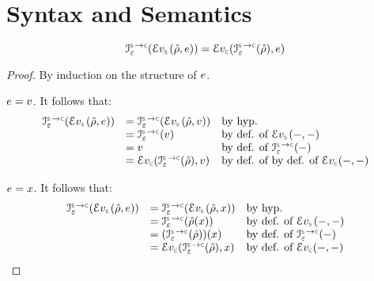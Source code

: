 
\newtheorem{lemmax}{}
\newtheorem{temax}{}
\newtheorem{cormax}{}


\section{\jsil Syntax and Semantics}

\begin{lemma}\label{symb:eval:expr}
$$
\interpret{\symbconc}{\senv}(\evalexpr{\symbolic}(\sstore, \jsilexpr)) = \evalexpr{\concrete}(\interpret{\symbconc}{\senv}(\sstore), \jsilexpr)
$$
\end{lemma}
\begin{proof}
By induction on the structure of  $e$. 
\vspace{5pt}

\noindent {} $e = v$. It follows that: 
$$
\begin{array}{lll}
  \interpret{\symbconc}{\senv}(\evalexpr{\symbolic}(\sstore, \jsilexpr))  &
       =  \interpret{\symbconc}{\senv}(\evalexpr{\symbolic}(\sstore, \val)) & \text{by hyp.} \\  & 
       =  \interpret{\symbconc}{\senv}(\val)  & \text{by def. of } \evalexpr{\symbolic}(-, -) \\ & 
       = \val  & \text{by def. of } \interpret{\symbconc}{\senv}(-) \\ &
       = \evalexpr{\concrete}(\interpret{\symbconc}{\senv}(\sstore), \val)  & \text{by def. of }  \text{by def. of } \evalexpr{\concrete}(-, -)
\end{array}
$$
\vspace{3pt}

\noindent {} $e = x$. It follows that: 
$$
\begin{array}{lll}
  \interpret{\symbconc}{\senv}(\evalexpr{\symbolic}(\sstore, \jsilexpr))  &
       =  \interpret{\symbconc}{\senv}(\evalexpr{\symbolic}(\sstore, \jvar)) & \text{by hyp.} \\  & 
       =  \interpret{\symbconc}{\senv}(\sstore(\jvar))  & \text{by def. of } \evalexpr{\symbolic}(-, -) \\ & 
       =  (\interpret{\symbconc}{\senv}(\sstore))(\jvar)   & \text{by def. of } \interpret{\symbconc}{\senv}(-) \\ &
       = \evalexpr{\concrete}(\interpret{\symbconc}{\senv}(\sstore), \jvar)  &  \text{by def. of } \evalexpr{\concrete}(-, -)
\end{array}
$$
\vspace{3pt}


\end{proof}
